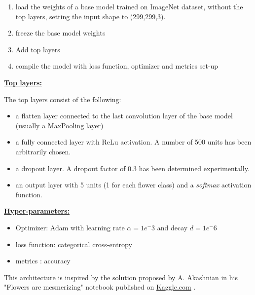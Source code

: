 \begin{enumerate}
	\setlength\itemsep{1pt}
	\setlength{\parskip}{0pt}
	\setlength{\parsep}{0pt}
	\item load the weights of a base model trained on ImageNet dataset, without the top layers, setting the input shape to (299,299,3).
	\item freeze the base model weights
	\item Add top layers 
	\item compile the model with loss function, optimizer and metrics set-up
\end{enumerate}

\underline{\textbf{Top layers:}}

The top layers consist of the following:

\begin{itemize}
	\setlength\itemsep{1pt}
	\setlength{\parskip}{0pt}
	\setlength{\parsep}{0pt}
	\item a flatten layer connected to the last convolution layer of the base model (usually a MaxPooling layer)
	\item a fully connected layer with ReLu activation. A number of 500 units has been arbitrarily chosen. 
	\item a dropout layer. A dropout factor of 0.3 has been determined experimentally. 
	\item an output layer with 5 units (1 for each flower class) and a \textit{softmax} activation function. 
\end{itemize}

\underline{\textbf{Hyper-parameters:}}

\begin{itemize}
	\setlength\itemsep{1pt}
	\setlength{\parskip}{0pt}
	\setlength{\parsep}{0pt}
	\item Optimizer: Adam with learning rate $\alpha=1e^-3$ and decay $d=1e^-6$ 
	\item loss function: categorical cross-entropy
	\item metrics : accuracy
\end{itemize}

This architecture is inspired by the solution proposed by A. Akashnian in his "Flowers are mesmerizing" notebook published on \href{https://www.kaggle.com/aakashnain/flowers-are-mesmerizing}{Kaggle.com}  \cite{NAIN_notebook}.

